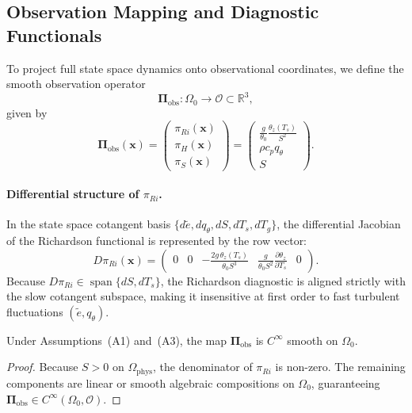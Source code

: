 \subsection{Observation Mapping and Diagnostic Functionals}

To project full state space dynamics onto observational coordinates, we define the smooth observation operator
\begin{equation}
\boldsymbol{\Pi}_{\mathrm{obs}} : \Omega_0 \to \mathcal O \subset \mathbb{R}^3,
\end{equation}
given by
\begin{equation}
\boldsymbol{\Pi}_{\mathrm{obs}}(\mathbf{x})
= \begin{pmatrix}
\pi_{Ri}(\mathbf{x}) \\
\pi_H(\mathbf{x}) \\
\pi_S(\mathbf{x})
\end{pmatrix}
= \begin{pmatrix}
\frac{g}{\theta_0}\frac{\theta_z(T_s)}{S^2} \\[4pt]
\rho c_p q_\theta \\[2pt]
S
\end{pmatrix}.
\end{equation}

\paragraph{Differential structure of $\pi_{Ri}$.}
In the state space cotangent basis $\{d\tilde e, dq_\theta, dS, dT_s, dT_g\}$, the differential Jacobian of the Richardson functional is represented by the row vector:
\begin{equation}
D\pi_{Ri}(\mathbf{x}) = \begin{pmatrix} 0 & 0 & -\frac{2g\,\theta_z(T_s)}{\theta_0 S^3} & \frac{g}{\theta_0 S^2}\frac{\partial \theta_z}{\partial T_s} & 0 \end{pmatrix}.
\end{equation}
Because $D\pi_{Ri} \in \operatorname{span}\{dS, dT_s\}$, the Richardson diagnostic is aligned strictly with the slow cotangent subspace, making it insensitive at first order to fast turbulent fluctuations $(\tilde e, q_\theta)$.

\begin{proposition}
Under Assumptions~(A1) and~(A3), the map $\boldsymbol{\Pi}_{\mathrm{obs}}$ is $C^\infty$ smooth on $\Omega_0$.
\end{proposition}

\begin{proof}
Because $S > 0$ on $\Omega_{\mathrm{phys}}$, the denominator of $\pi_{Ri}$ is non-zero. The remaining components are linear or smooth algebraic compositions on $\Omega_0$, guaranteeing $\boldsymbol{\Pi}_{\mathrm{obs}} \in C^\infty(\Omega_0, \mathcal O)$.
\end{proof}